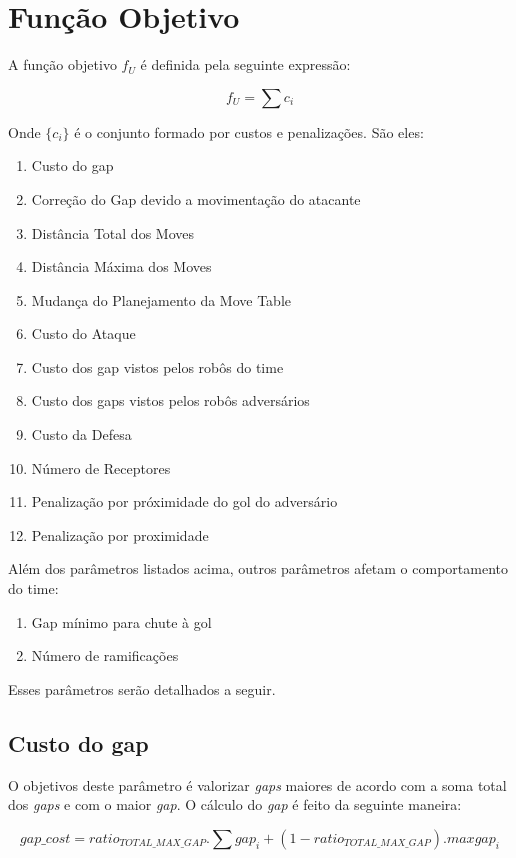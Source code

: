 \section{Função Objetivo}
A função objetivo $f_U$ é definida pela seguinte
expressão:

\begin{dmath}
  f_U = \sum c_i 
\end{dmath}

Onde $\lbrace c_i \rbrace$ é o conjunto formado
por custos e penalizações. São eles:
\begin{enumerate}
  \item Custo do gap
  \item Correção do Gap devido a movimentação do atacante
  \item Distância Total dos Moves
  \item Distância Máxima dos Moves 
  \item Mudança do Planejamento da Move Table
  \item Custo do Ataque
  \item Custo dos gap vistos pelos robôs do time
  \item Custo dos gaps vistos pelos robôs adversários
  \item Custo da Defesa
  \item Número de Receptores
  \item Penalização por próximidade do gol do adversário
  \item Penalização por proximidade
\end{enumerate}

Além dos parâmetros listados acima, outros parâmetros
afetam o comportamento do time:
\begin{enumerate}
  \item Gap mínimo para chute à gol
  \item Número de ramificações
\end{enumerate}

Esses parâmetros serão detalhados a seguir.

\subsection{Custo do gap} 
O objetivos deste parâmetro é valorizar \textit{gaps} maiores
de acordo com a soma total dos \textit{gaps} e com o maior \textit{gap}.
O cálculo do \textit{gap} é feito da seguinte maneira:

\begin{dmath} 
 gap{\_}cost = ratio_{TOTAL{\_}MAX{\_}GAP} . \sum gap_i
 + (1 - ratio_{TOTAL{\_}MAX{\_}GAP}) . max{gap_i} 
\end{dmath} 


